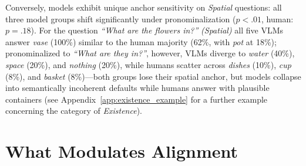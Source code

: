 \documentclass[letterpaper]{article}
\begin{document}
Conversely, models exhibit unique anchor sensitivity on \textit{Spatial} questions: all three model groups shift significantly under pronominalization ($p{<}.01$, human: $p{=}.18$). %
For the question \textit{``What are the flowers in?''} \emph{(Spatial)}  all five VLMs answer \textit{vase}  (100\%) similar to the human majority (62\%, with \textit{pot} at 18\%); pronominalized to \textit{``What are they in?''}, however, VLMs diverge to \textit{water} (40\%), \textit{space} (20\%), and \textit{nothing} (20\%), while humans scatter across \textit{dishes} (10\%), \textit{cup} (8\%), and \textit{basket} (8\%)---both groups lose their spatial anchor, but models collapse into semantically incoherent defaults while humans answer with plausible containers (see Appendix~\ref{app:existence_example} for a further example concerning the category of \textit{Existence}).


\section{What Modulates Alignment}
\label{sec:ablation}


\end{document}
